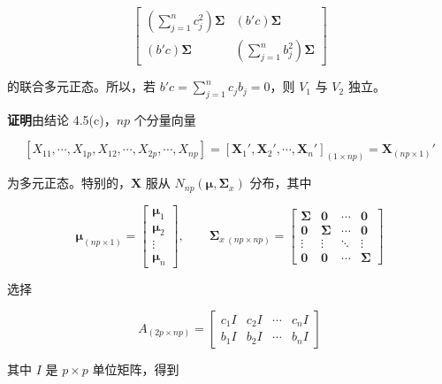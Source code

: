 \[
\begin{bmatrix}
\left(\sum\limits_{j=1}^{n}c_j^2\right)\boldsymbol{\Sigma} & (b'c)\boldsymbol{\Sigma}\\[6pt]
(b'c)\boldsymbol{\Sigma} & \left(\sum\limits_{j=1}^{n}b_j^2\right)\boldsymbol{\Sigma}
\end{bmatrix}
\]

的联合多元正态。所以，若 $b'c=\sum\limits_{j=1}^{n}c_jb_j=0$，则 $V_1$ 与 $V_2$ 独立。

\noindent\textbf{证明}\quad 由结论 4.5(c)，$np$ 个分量向量

\[
[X_{11},\cdots,X_{1p},X_{12},\cdots,X_{2p},\cdots,X_{np}]=[\mathbf{X}_1',\mathbf{X}_2',\cdots,\mathbf{X}_n']_{(1\times np)}=\mathbf{X}_{(np\times1)}'
\]

为多元正态。特别的，$\mathbf{X}$ 服从 $N_{np}(\boldsymbol{\mu},\boldsymbol{\Sigma}_x)$ 分布，其中

\[
\boldsymbol{\mu}_{(np\times1)}=\begin{bmatrix}\boldsymbol{\mu}_1\\\boldsymbol{\mu}_2\\\vdots\\\boldsymbol{\mu}_n\end{bmatrix},\qquad
\boldsymbol{\Sigma}_{x\ (np\times np)}=\begin{bmatrix}
\boldsymbol{\Sigma} & \mathbf{0} & \cdots & \mathbf{0}\\
\mathbf{0} & \boldsymbol{\Sigma} & \cdots & \mathbf{0}\\
\vdots & \vdots & \ddots & \vdots\\
\mathbf{0} & \mathbf{0} & \cdots & \boldsymbol{\Sigma}
\end{bmatrix}
\]

选择

\[
A_{(2p\times np)}=\begin{bmatrix}c_1I & c_2I & \cdots & c_nI\\ b_1I & b_2I & \cdots & b_nI\end{bmatrix}
\]

其中 $I$ 是 $p\times p$ 单位矩阵，得到
